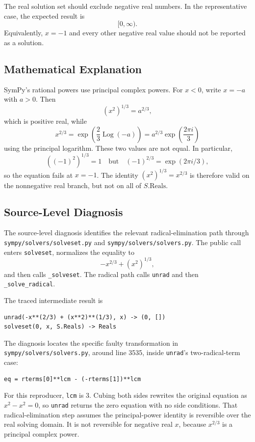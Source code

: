 \documentclass[11pt]{article}
\begin{document}
The real solution set should exclude negative real numbers.  In the representative case, the expected result is
\[
  [0,\infty).
\]
Equivalently, \(x=-1\) and every other negative real value should not be reported as a solution.

\subsection{Mathematical Explanation}

SymPy's rational powers use principal complex powers.  For \(x<0\), write \(x=-a\) with \(a>0\).  Then
\[
  (x^2)^{1/3}=a^{2/3},
\]
which is positive real, while
\[
  x^{2/3}=\exp\!\left(\frac{2}{3}\operatorname{Log}(-a)\right)
          = a^{2/3}\exp\!\left(\frac{2\pi i}{3}\right)
\]
using the principal logarithm.  These two values are not equal.  In particular,
\[
  ((-1)^2)^{1/3}=1
  \quad\text{but}\quad
  (-1)^{2/3}=\exp(2\pi i/3),
\]
so the equation fails at \(x=-1\).  The identity \((x^2)^{1/3}=x^{2/3}\) is therefore valid on the nonnegative real branch, but not on all of \(S.\mathrm{Reals}\).

\subsection{Source-Level Diagnosis}

The source-level diagnosis identifies the relevant radical-elimination path through \nolinkurl{sympy/solvers/solveset.py} and \nolinkurl{sympy/solvers/solvers.py}.  The public call enters \texttt{solveset}, normalizes the equality to
\[
  -x^{2/3} + (x^2)^{1/3},
\]
and then calls \texttt{\_solveset}.  The radical path calls \texttt{unrad} and then \texttt{\_solve\_radical}.

The traced intermediate result is
\begin{lstlisting}[style=bugpython]
unrad(-x**(2/3) + (x**2)**(1/3), x) -> (0, [])
solveset(0, x, S.Reals) -> Reals
\end{lstlisting}

The diagnosis locates the specific faulty transformation in \nolinkurl{sympy/solvers/solvers.py}, around line 3535, inside \texttt{unrad}'s two-radical-term case:
\begin{lstlisting}[style=bugpython]
eq = rterms[0]**lcm - (-rterms[1])**lcm
\end{lstlisting}
For this reproducer, \texttt{lcm} is \(3\).  Cubing both sides rewrites the original equation as \(x^2-x^2=0\), so \texttt{unrad} returns the zero equation with no side conditions.  That radical-elimination step assumes the principal-power identity is reversible over the real solving domain.  It is not reversible for negative real \(x\), because \(x^{2/3}\) is a principal complex power.
\end{document}
